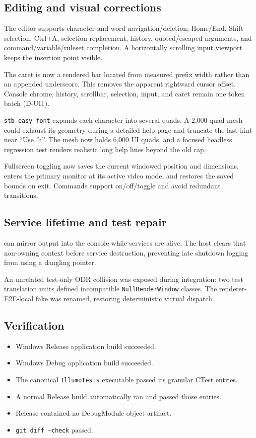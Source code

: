 \subsection{Editing and visual corrections}

The editor supports character and word navigation/deletion, Home/End, Shift
selection, Ctrl+A, selection replacement, history, quoted/escaped arguments,
and command/variable/ruleset completion. A horizontally scrolling input
viewport keeps the insertion point visible.

The caret is now a rendered bar located from measured prefix width rather than
an appended underscore. This removes the apparent rightward cursor offset.
Console chrome, history, scrollbar, selection, input, and caret remain one
token batch (D-UI1).

\texttt{stb\_easy\_font} expands each character into several quads. A 2,000-quad
mesh could exhaust its geometry during a detailed help page and truncate the
last hint near ``Use 'h''. The mesh now holds 6,000 UI quads, and a focused
headless regression test renders realistic long help lines beyond the old cap.

Fullscreen toggling now saves the current windowed position and dimensions,
enters the primary monitor at its active video mode, and restores the saved
bounds on exit. Commands support on/off/toggle and avoid redundant transitions.

\subsection{Service lifetime and test repair}

 can mirror output into the console while services are alive.
The host clears that non-owning context before service destruction, preventing
late shutdown logging from using a dangling pointer.

An unrelated test-only ODR collision was exposed during integration: two test
translation units defined incompatible \texttt{NullRenderWindow} classes. The
renderer-E2E-local fake was renamed, restoring deterministic virtual dispatch.

\subsection{Verification}

\begin{itemize}
  \item Windows Release application build succeeded.
  \item Windows Debug application build succeeded.
  \item The canonical \texttt{IllumoTests} executable passed its granular
        CTest entries.
  \item A normal Release build automatically ran and passed those entries.
  \item Release contained no DebugModule object artifact.
  \item \texttt{git diff --check} passed.
\end{itemize}

